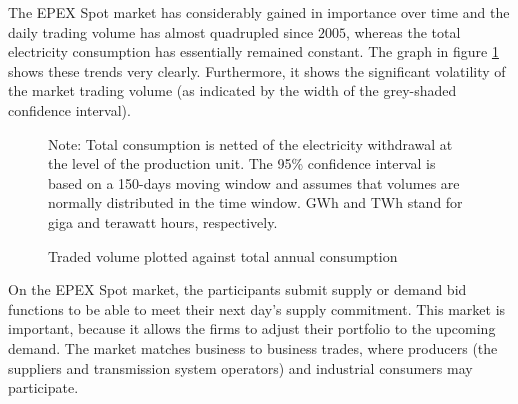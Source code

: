 The EPEX Spot market has considerably gained in importance over time and the daily trading volume has almost quadrupled since $2005$, whereas the total electricity consumption has essentially remained constant. The graph in figure \ref{volconsfr} shows these trends very clearly. Furthermore, it shows the significant volatility of the market trading volume (as indicated by the width 
of the grey-shaded confidence interval).  
\begin{figure}[!ht]
\begin{center}  \end{center}
\caption{Traded volume plotted against total annual consumption}
\label{volconsfr}
{\small Note: Total consumption is netted of the electricity withdrawal at the level of the production unit. The 95\% confidence interval is based on a 150-days moving window and assumes that volumes are normally distributed in the time window. GWh and TWh stand for giga and terawatt hours, respectively.}
\end{figure}


On the EPEX Spot market, the participants submit supply or demand bid functions to be able to meet their next day's supply commitment. 
This market is important, because it allows the firms to adjust their  portfolio to the upcoming demand. The market matches business to business trades, where producers (the suppliers and transmission system operators) and industrial consumers may participate.

